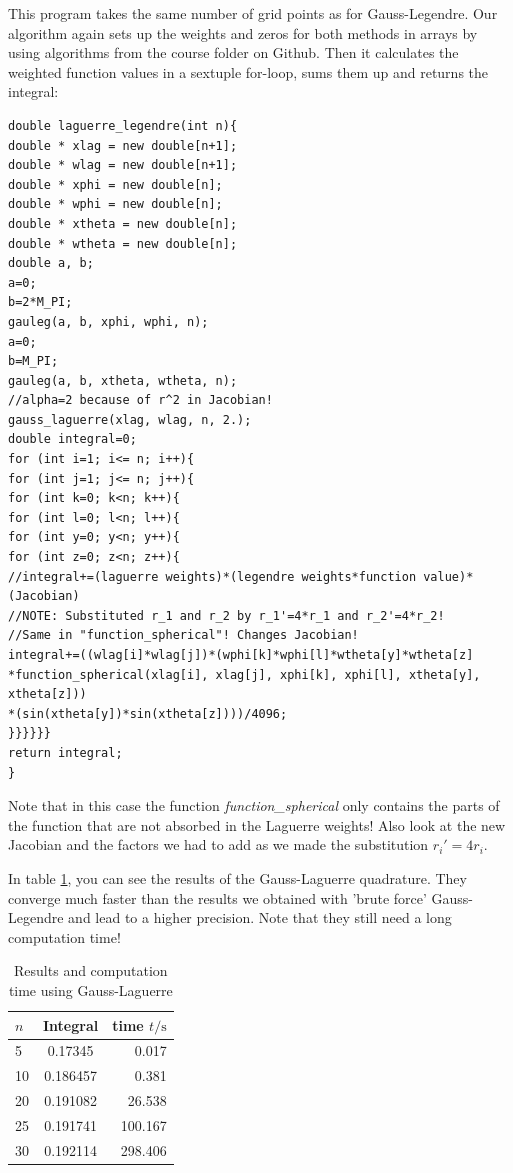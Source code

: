 \documentclass[10pt,a4paper]{article}
\begin{document}
This program takes the same number of grid points as for Gauss-Legendre. Our algorithm again sets up the weights and zeros for both methods in arrays by using algorithms from the course folder on Github. Then it calculates the weighted function values in a sextuple for-loop, sums them up and returns the integral:
\clearpage
\begin{lstlisting}
double laguerre_legendre(int n){
double * xlag = new double[n+1];
double * wlag = new double[n+1];
double * xphi = new double[n];
double * wphi = new double[n];
double * xtheta = new double[n];
double * wtheta = new double[n];
double a, b;
a=0;
b=2*M_PI;
gauleg(a, b, xphi, wphi, n);
a=0;
b=M_PI;
gauleg(a, b, xtheta, wtheta, n);
//alpha=2 because of r^2 in Jacobian!
gauss_laguerre(xlag, wlag, n, 2.);
double integral=0;
for (int i=1; i<= n; i++){
for (int j=1; j<= n; j++){
for (int k=0; k<n; k++){
for (int l=0; l<n; l++){
for (int y=0; y<n; y++){
for (int z=0; z<n; z++){
//integral+=(laguerre weights)*(legendre weights*function value)*(Jacobian)
//NOTE: Substituted r_1 and r_2 by r_1'=4*r_1 and r_2'=4*r_2!
//Same in "function_spherical"! Changes Jacobian!
integral+=((wlag[i]*wlag[j])*(wphi[k]*wphi[l]*wtheta[y]*wtheta[z]
*function_spherical(xlag[i], xlag[j], xphi[k], xphi[l], xtheta[y], xtheta[z]))
*(sin(xtheta[y])*sin(xtheta[z])))/4096;
}}}}}}
return integral;
}
\end{lstlisting}
Note that in this case the function \emph{function\_spherical} only contains the parts of the function that are not absorbed in the Laguerre weights! Also look at the new Jacobian and the factors we had to add as we made the substitution $r_i'=4r_i$.

In table \ref{results_lag}, you can see the results of the Gauss-Laguerre quadrature. They converge much faster than the results we obtained with 'brute force' Gauss-Legendre and lead to a higher precision. Note that they still need a long computation time!

\begin{table}[h]
	\caption{Results and computation time using Gauss-Laguerre\label{results_lag}}
	\centering
	\begin{tabular}{lcr}
		$n$	&	Integral	&	time $t/\mathrm{s}$	\\\hline
		5	&	0.17345	&	0.017	\\
		10	&	0.186457	&	0.381	\\
		20	&	0.191082	&	26.538	\\
		25	&	0.191741	&	100.167	\\
		30	&	0.192114	&	298.406	
	\end{tabular}
\end{table}
\end{document}
